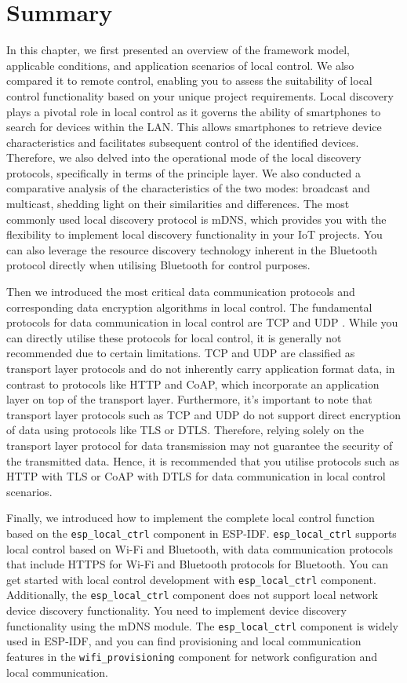 \documentclass[a4paper,12pt,openany]{book}
\begin{document}
\section{Summary}
In this chapter, we first presented an overview of the framework model, applicable conditions, and application scenarios of local control. We also compared it to remote control, enabling you to assess the suitability of local control functionality based on your unique project requirements. Local discovery plays a pivotal role in local control as it governs the ability of smartphones to search for devices within the LAN. This allows smartphones to retrieve device characteristics and facilitates subsequent control of the identified devices. Therefore, we also delved into the operational mode of the local discovery protocols, specifically in terms of the principle layer. We also conducted a comparative analysis of the characteristics of the two modes: broadcast and multicast, shedding light on their similarities and differences. The most commonly used local discovery protocol is mDNS, which provides you with the flexibility to implement local discovery functionality in your IoT projects. You can also leverage the resource discovery technology inherent in the Bluetooth protocol directly when utilising Bluetooth for control purposes.

Then we introduced the most critical data communication protocols and corresponding data encryption algorithms in local control. The fundamental protocols for data communication in local control are TCP and UDP . While you can directly utilise these protocols for local control, it is generally not recommended due to certain limitations. TCP and UDP are classified as transport layer protocols and do not inherently carry application format data, in contrast to protocols like HTTP and CoAP, which incorporate an application layer on top of the transport layer. Furthermore, it’s important to note that transport layer protocols such as TCP and UDP do not support direct encryption of data using protocols like TLS or DTLS. Therefore, relying solely on the transport layer protocol for data transmission may not guarantee the security of the transmitted data. Hence, it is recommended that you utilise protocols such as HTTP with TLS or CoAP with DTLS for data communication in local control scenarios. 

Finally, we introduced how to implement the complete local control function based on the \verb|esp_local_ctrl| component in ESP-IDF. \verb|esp_local_ctrl| supports local control based on Wi-Fi and Bluetooth, with data communication protocols that include HTTPS for Wi-Fi and Bluetooth protocols for Bluetooth. You can get started with local control development with \verb|esp_local_ctrl| component. Additionally, the \verb|esp_local_ctrl| component does not support local network device discovery functionality. You need to implement device discovery functionality using the mDNS module. The \verb|esp_local_ctrl| component is widely used in ESP-IDF, and you can find provisioning and local communication features in the \verb|wifi_provisioning| component for network configuration and local communication.
\end{document}
